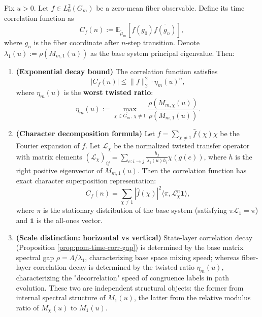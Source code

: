 \begin{theorem}[Congruence Fiber Correlation Decay Rate = Worst Twisted Ratio]\label{thm:pom-fiber-corr-decay}
Fix $u>0$. Let $f \in L^2_0(G_m)$ be a zero-mean fiber observable. Define its time correlation function as
\[
C_f(n) := \mathbb{E}_{\widetilde\mu_m} [f(g_0) \overline{f(g_n)}],
\]
where $g_n$ is the fiber coordinate after $n$-step transition. Denote $\lambda_1(u) := \rho(M_{m,1}(u))$ as the base system principal eigenvalue. Then:
\begin{enumerate}
    \item \textbf{(Exponential decay bound)} The correlation function satisfies
    \[
    |C_f(n)| \le \|f\|_2^2 \cdot \eta_m(u)^n,
    \]
    where $\eta_m(u)$ is the \textbf{worst twisted ratio}:
    \[
    \eta_m(u) := \max_{\chi \in \widehat{G_m},\, \chi \neq 1} \frac{\rho(M_{m,\chi}(u))}{\rho(M_{m,1}(u))}.
    \]
    \item \textbf{(Character decomposition formula)} Let $f = \sum_{\chi \neq 1} \hat{f}(\chi) \chi$ be the Fourier expansion of $f$. Let $\mathcal{L}_\chi$ be the normalized twisted transfer operator with matrix elements $(\mathcal{L}_\chi)_{ij} = \sum_{e:i\to j} \frac{h_j}{\lambda_1(u) h_i} \chi(g(e))$, where $h$ is the right positive eigenvector of $M_{m,1}(u)$. Then the correlation function has exact character superposition representation:
    \[
    C_f(n) = \sum_{\chi \neq 1} |\hat{f}(\chi)|^2 \langle \pi, \mathcal{L}_\chi^n \mathbf{1} \rangle,
    \]
    where $\pi$ is the stationary distribution of the base system (satisfying $\pi \mathcal{L}_1 = \pi$) and $\mathbf{1}$ is the all-ones vector.
    \item \textbf{(Scale distinction: horizontal vs vertical)}
    State-layer correlation decay (Proposition \ref{prop:pom-time-corr-gap}) is determined by the base matrix spectral gap $\rho = \Lambda/\lambda_1$, characterizing base space mixing speed;
    whereas fiber-layer correlation decay is determined by the twisted ratio $\eta_m(u)$, characterizing the "decorrelation" speed of congruence labels in path evolution.
    These two are independent structural objects: the former from internal spectral structure of $M_1(u)$, the latter from the relative modulus ratio of $M_\chi(u)$ to $M_1(u)$.
\end{enumerate}
\end{theorem}

